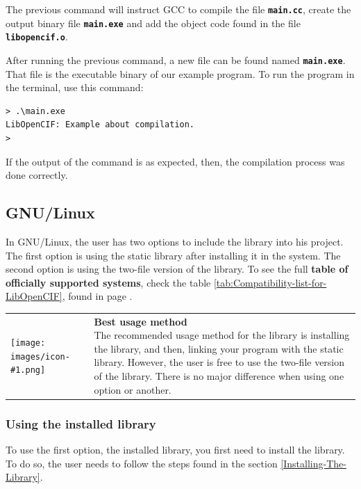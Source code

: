 \documentclass[11pt,twoside,openany,x11names,svgnames]{memoir}
\makeatletter
\newcommand{\IconNote}[3]
{
	\begin{table}[ht]
	\begin{tabular}{ lm{\dimexpr\textwidth-8\tabcolsep-\wd0}@{}}
		\toprule
		\texttt{[image: images/icon-\#1.png]}
		&
		\parbox[t]{155mm}{
		\textbf{#2} \\
		#3
		}
	\end{tabular}
\end{table}
}
\makeatother
\begin{document}
The previous command will instruct GCC to compile the file \textbf{\texttt{main.cc}}, create the output binary file \textbf{\texttt{main.exe}} and add the object code found in the file \textbf{\texttt{libopencif.o}}.

After running the previous command, a new file can be found named \textbf{\texttt{main.exe}}. That file is the executable binary of our example program. To run the program in the terminal, use this command:

\begin{lstlisting}[frame=single,style=SystemCommandStyle]
> .\main.exe
LibOpenCIF: Example about compilation.
>
\end{lstlisting}

If the output of the command is as expected, then, the compilation process was done correctly.

\subsection{GNU/Linux}\label{GNU-Linux}

In GNU/Linux, the user has two options to include the library into his project. The first option is using the static library after installing it in the system. The second option is using the two-file version of the library. To see the full \textbf{table of officially supported systems}, check the table \ref{tab:Compatibility-list-for-LibOpenCIF}, found in page \pageref{tab:Compatibility-list-for-LibOpenCIF}.

\IconNote
	{info}
	{Best usage method}
	{The recommended usage method for the library is installing the library, and then, linking your program with the static library. However, the user is free to use the two-file version of the library. There is no major difference when using one option or another.}
	
\subsubsection{Using the installed library}\label{Using-the-installed-library}
	
To use the first option, the installed library, you first need to install the library. To do so, the user needs to follow the steps found in the section \ref{Installing-The-Library}.
\end{document}
